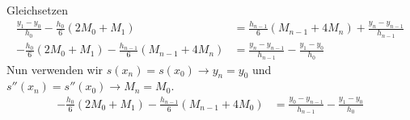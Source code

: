 \documentclass[10pt,a4paper]{article}
\begin{document}
        Gleichsetzen
        \begin{align*}
            \frac{y_1-y_0}{h_0}-\frac{h_0}{6}(2M_0+M_1) &= \frac{h_{n-1}}{6}\left(M_{n-1}+4M_n\right)+\frac{y_n-y_{n-1}}{h_{n-1}}  \\
           -\frac{h_0}{6}(2M_0+M_1)-\frac{h_{n-1}}{6}\left(M_{n-1}+4M_n\right)
            &=
            \frac{y_n-y_{n-1}}{h_{n-1}}-\frac{y_1-y_0}{h_0}
        \end{align*}
        Nun verwenden wir $s(x_n)=s(x_0) \rightarrow y_{n}=y_0$ und $s''(x_n)=s''(x_0) \rightarrow M_n=M_0$.
        \begin{align*}
            -\frac{h_0}{6}(2M_0+M_1)-\frac{h_{n-1}}{6}\left(M_{n-1}+4M_0\right)
            &=
            \frac{y_0-y_{n-1}}{h_{n-1}}-\frac{y_1-y_0}{h_0}
        \end{align*}
\end{document}
